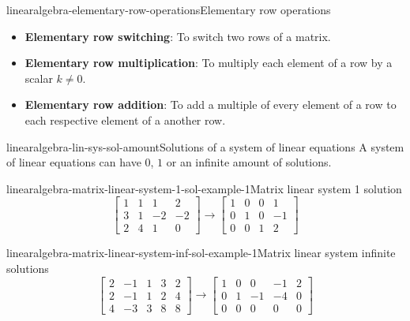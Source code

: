 \documentclass[preview]{standalone}
\begin{document}
\begin{snippetdefinition}{linearalgebra-elementary-row-operations}{Elementary row operations}{
    \begin{itemize}
        \item \textbf{Elementary row switching}:
        To switch two rows of a matrix.
        \item \textbf{Elementary row multiplication}:
        To multiply each element of a row by
        a scalar \(k \neq 0\).
        \item \textbf{Elementary row addition}:
        To add a multiple of every element of a row
        to each respective element of a another row.
    \end{itemize}
}
\end{snippetdefinition}

\begin{snippetproposition}{linearalgebra-lin-sys-sol-amount}{Solutions of a system of linear equations}{
    A system of linear equations can have \(0\), \(1\)
    or an infinite amount of solutions.
}
\end{snippetproposition}

\begin{snippetexample}{linearalgebra-matrix-linear-system-1-sol-example-1}{Matrix linear system 1 solution}{
    \[
        \begin{bmatrix}
            1 & 1 & 1 & 2 \\
            3 & 1 & -2 & -2 \\
            2 & 4 & 1 & 0
        \end{bmatrix}
        \rightarrow
        \begin{bmatrix}
            1 & 0 & 0 & 1 \\
            0 & 1 & 0 & -1 \\
            0 & 0 & 1 & 2
        \end{bmatrix}
    \]
}
\end{snippetexample}

\begin{snippetexample}{linearalgebra-matrix-linear-system-inf-sol-example-1}{Matrix linear system infinite solutions}{
    \[
        \begin{bmatrix}
            2 & -1 & 1 & 3 & 2 \\
            2 & -1 & 1 & 2 & 4 \\
            4 & -3 & 3 & 8 & 8
        \end{bmatrix}
        \rightarrow
        \begin{bmatrix}
            1 & 0 & 0 & -1 & 2 \\
            0 & 1 & -1 & -4 & 0 \\
            0 & 0 & 0 & 0 & 0
        \end{bmatrix}
    \]
}
\end{snippetexample}
\end{document}
